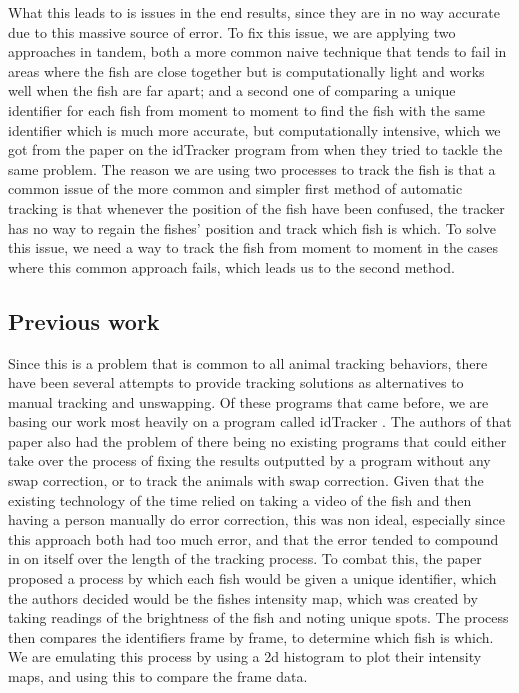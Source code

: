 \documentclass{article}
\begin{document}
What this leads to is issues in the end results, since they are in no way accurate due to this massive source of error. To fix this issue, we are applying two approaches in tandem, both a more common naive technique that tends to fail in areas where the fish are close together but is computationally light and works well when the fish are far apart; and a second one of comparing a unique identifier for each fish from moment to moment to find the fish with the same identifier which is much more accurate, but computationally intensive, which we got from the paper on the idTracker program from when they tried to tackle the same problem\cite{perez-escudero_idtracker_2014}. The reason we are using two processes to track the fish is that a common issue of the more common and simpler first method of automatic tracking is that whenever the position of the fish have been confused, the tracker has no way to regain the fishes' position and track which fish is which. To solve this issue, we need a way to track the fish from moment to moment in the cases where this common approach fails, which leads us to the second method.

\subsection{Previous work}
 

Since this is a problem that is common to all animal tracking behaviors, there have been several attempts to provide tracking solutions as alternatives to manual tracking and unswapping. Of these programs that came before, we are basing our work most heavily on a program called idTracker \cite{perez-escudero_idtracker_2014}. The authors of that paper also had the problem of there being no existing programs that could either take over the process of fixing the results outputted by a program without any swap correction, or to track the animals with swap correction. Given that the existing technology of the time relied on taking a video of the fish and then having a person manually do error correction, this was non ideal, especially since this approach both had too much error, and that the error tended to compound in on itself over the length of the tracking process. To combat this, the paper proposed a process by which each fish would be given a unique identifier, which the authors decided would be the fishes intensity map, which was created by taking readings of the brightness of the fish and noting unique spots. The process then compares the identifiers frame by frame, to determine which fish is which. We are emulating this process by using a 2d histogram to plot their intensity maps, and using this to compare the frame data.
\end{document}
